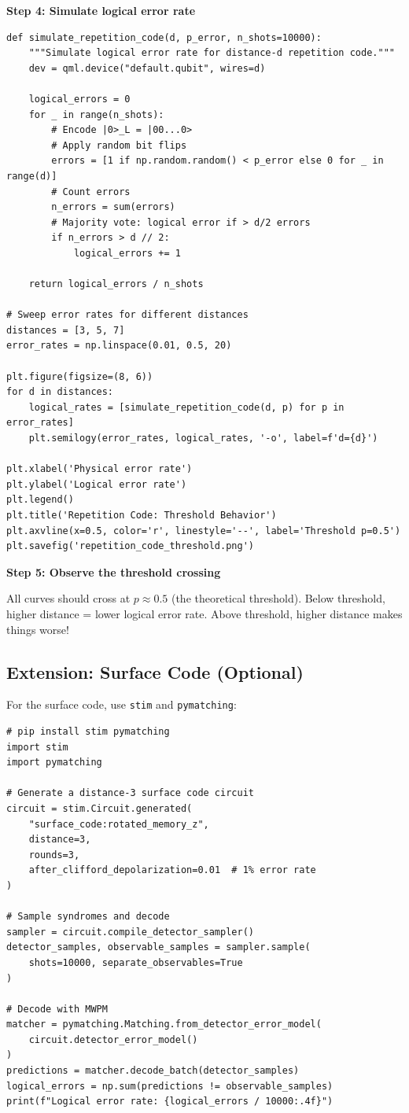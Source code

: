 \documentclass[11pt,a4paper]{article}
\begin{document}
\textbf{Step 4: Simulate logical error rate}
\begin{lstlisting}
def simulate_repetition_code(d, p_error, n_shots=10000):
    """Simulate logical error rate for distance-d repetition code."""
    dev = qml.device("default.qubit", wires=d)
    
    logical_errors = 0
    for _ in range(n_shots):
        # Encode |0>_L = |00...0>
        # Apply random bit flips
        errors = [1 if np.random.random() < p_error else 0 for _ in range(d)]
        # Count errors
        n_errors = sum(errors)
        # Majority vote: logical error if > d/2 errors
        if n_errors > d // 2:
            logical_errors += 1
    
    return logical_errors / n_shots

# Sweep error rates for different distances
distances = [3, 5, 7]
error_rates = np.linspace(0.01, 0.5, 20)

plt.figure(figsize=(8, 6))
for d in distances:
    logical_rates = [simulate_repetition_code(d, p) for p in error_rates]
    plt.semilogy(error_rates, logical_rates, '-o', label=f'd={d}')

plt.xlabel('Physical error rate')
plt.ylabel('Logical error rate')
plt.legend()
plt.title('Repetition Code: Threshold Behavior')
plt.axvline(x=0.5, color='r', linestyle='--', label='Threshold p=0.5')
plt.savefig('repetition_code_threshold.png')
\end{lstlisting}

\textbf{Step 5: Observe the threshold crossing}

All curves should cross at $p \approx 0.5$ (the theoretical threshold). Below threshold, higher distance = lower logical error rate. Above threshold, higher distance makes things worse!

\subsection*{Extension: Surface Code (Optional)}

For the surface code, use \texttt{stim} and \texttt{pymatching}:
\begin{lstlisting}
# pip install stim pymatching
import stim
import pymatching

# Generate a distance-3 surface code circuit
circuit = stim.Circuit.generated(
    "surface_code:rotated_memory_z",
    distance=3,
    rounds=3,
    after_clifford_depolarization=0.01  # 1% error rate
)

# Sample syndromes and decode
sampler = circuit.compile_detector_sampler()
detector_samples, observable_samples = sampler.sample(
    shots=10000, separate_observables=True
)

# Decode with MWPM
matcher = pymatching.Matching.from_detector_error_model(
    circuit.detector_error_model()
)
predictions = matcher.decode_batch(detector_samples)
logical_errors = np.sum(predictions != observable_samples)
print(f"Logical error rate: {logical_errors / 10000:.4f}")
\end{lstlisting}
\end{document}
